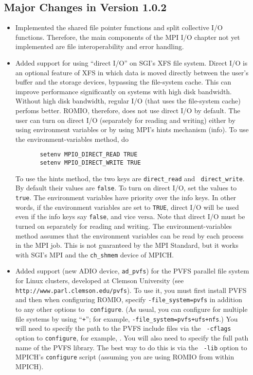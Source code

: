 \subsection{Major Changes in Version 1.0.2}
\begin{itemize}
\item Implemented the shared file pointer functions and
  split collective I/O functions. Therefore, the main
   components of the MPI I/O chapter not yet implemented are
  file interoperability and error handling.

\item Added support for using ``direct I/O'' on SGI's XFS file system. 
  Direct I/O is an optional feature of XFS in which data is moved
  directly between the user's buffer and the storage devices, bypassing 
  the file-system cache. This can improve performance significantly on 
  systems with high disk bandwidth. Without high disk bandwidth,
  regular I/O (that uses the file-system cache) perfoms better.
  ROMIO, therefore, does not use direct I/O by default. The user can
  turn on direct I/O (separately for reading and writing) either by
  using environment variables or by using MPI's hints mechanism (info). 
  To use the environment-variables method, do
\begin{verbatim}
       setenv MPIO_DIRECT_READ TRUE
       setenv MPIO_DIRECT_WRITE TRUE
\end{verbatim}
  To use the hints method, the two keys are {\tt direct\_read} and {\tt
  direct\_write}.  By default their values are {\tt false}. To turn on
  direct I/O, set the values to {\tt true}. The environment variables
  have priority over the info keys.  In other words, if the environment
  variables are set to {\tt TRUE}, direct I/O will be used even if the
  info keys say {\tt false}, and vice versa.  Note that direct I/O must be
  turned on separately for reading and writing.  The environment-variables
  method assumes that the environment variables can be read by each
  process in the MPI job. This is not guaranteed by the MPI Standard,
  but it works with SGI's MPI and the {\tt ch\_shmem} device of MPICH.

\item Added support (new ADIO device, {\tt ad\_pvfs}) for the PVFS parallel 
  file system for Linux clusters, developed at Clemson University
  (see {\tt http://www.parl.clemson.edu/pvfs}). To use it, you
  must first install PVFS and then when configuring ROMIO, specify
  {\tt -file\_system=pvfs} in addition to any other options to {\tt
  configure}. (As usual, you can configure for multiple file systems by
  using ``{\tt +}''; for example, {\tt -file\_system=pvfs+ufs+nfs}.) You
  will need to specify the path to the PVFS include files via the {\tt
  -cflags} option to {\tt configure}, for example, . You will also need to specify the full
  path name of the PVFS library. The best way to do this is via the {\tt
  -lib} option to MPICH's {\tt configure} script (assuming you are using
  ROMIO from within MPICH).


\end{itemize}
